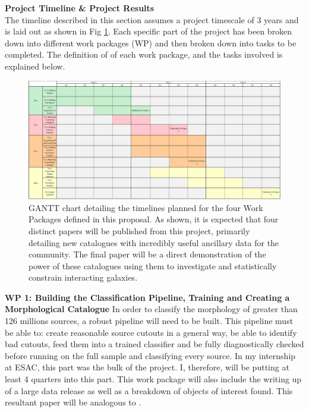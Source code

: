 \documentclass[11pt,usenatbib]{article}
\begin{document}
\vspace{-3mm}
\describearchival
\vspace{-3mm}
\noindent\textbf{Project Timeline \& Project Results} \\
\noindent The timeline described in this section assumes a project timescale of 3 years and is laid out as shown in Fig \ref{fig:gantt-chart}. Each specific part of the project has been broken down into different work packages (WP) and then broken down into tasks to be completed. The definition of of each work package, and the tasks involved is explained below.

\begin{figure}
    \centering
    \includegraphics[width = \textwidth]{figures/draft-gantt.png}
    \caption{GANTT chart detailing the timelines planned for the four Work Packages defined in this proposal. As shown, it is expected that four distinct papers will be published from this project, primarily detailing new catalogues with incredibly useful ancillary data for the community. The final paper will be a direct demonstration of the power of these catalogues using them to investigate and statistically constrain interacting galaxies.}
    \label{fig:gantt-chart}
\end{figure}

\noindent \textbf{WP 1: Building the Classification Pipeline, Training and Creating a Morphological Catalogue} In order to classify the morphology of greater than 126 millions sources, a robust pipeline will need to be built. This pipeline must be able to: create reasonable source cutouts in a general way, be able to identify bad cutouts, feed them into a trained classifier and be fully diagnostically checked before running on the full sample and classifying every source. In my internship at ESAC, this part was the bulk of the project. I, therefore, will be putting at least 4 quarters into this part. This work package will also include the writing up of a large data release as well as a breakdown of objects of interest found. This resultant paper will be analogous to \citet{O'Ryan}.
\end{document}
